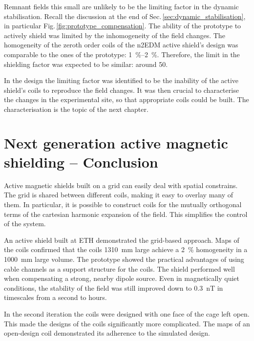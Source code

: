 Remnant fields this small are unlikely to be the limiting factor in the dynamic stabilisation. Recall the discussion at the end of Sec.\,\ref{sec:dynamic_stabilisation}, in particular Fig.\,\ref{fig:prototype_compensation}. The ability of the prototype to actively shield was limited by the inhomogeneity of the field changes. The homogeneity of the zeroth order coils of the n2EDM active shield's design was comparable to the ones of the prototype: \SIrange[range-phrase=--,range-units=single]{1}{2}{\percent}. Therefore, the limit in the shielding factor was expected to be similar: around 50.

In the design the limiting factor was identified to be the inability of the active shield's coils to reproduce the field changes. It was then crucial to characterise the changes in the experimental site, so that appropriate coils could be built. The characterisation is the topic of the next chapter.




\section*{Next generation active magnetic shielding -- Conclusion}
Active magnetic shields built on a grid can easily deal with spatial constrains. The grid is shared between different coils, making it easy to overlay many of them. In particular, it is possible to construct coils for the mutually orthogonal terms of the cartesian harmonic expansion of the field. This simplifies the control of the system.

An active shield built at ETH demonstrated the grid-based approach. Maps of the coils confirmed that the coils \SI{1310}{\milli\metre} large achieve a \SI{2}{\percent} homogeneity in a \SI{1000}{\milli\metre} large volume. The prototype showed the practical advantages of using cable channels as a support structure for the coils. The shield performed well when compensating a strong, nearby dipole source. Even in magnetically quiet conditions, the stability of the field was still improved down to \SI{0.3}{\nano\tesla} in timescales from a second to hours.

In the second iteration the coils were designed with one face of the cage left open. This made the designs of the coils significantly more complicated. The maps of an open-design coil demonstrated its adherence to the simulated design.

